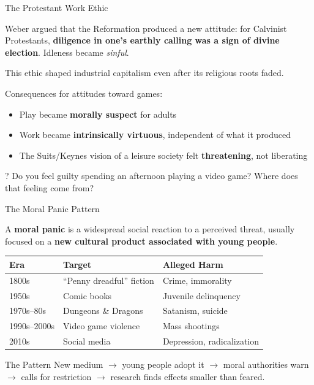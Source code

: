 \documentclass[aspectratio=169,11pt]{beamer}
\begin{document}
\begin{frame}[t]{The Protestant Work Ethic}
\begin{conceptbox}
\footnotesize
Weber argued that the Reformation produced a new attitude: for Calvinist Protestants, \textbf{diligence in one's earthly calling was a sign of divine election}. Idleness became \emph{sinful}.

\vspace{0.1cm}
This ethic shaped industrial capitalism even after its religious roots faded.
\end{conceptbox}

\vspace{0.15cm}
\footnotesize
Consequences for attitudes toward games:
\begin{itemize}
    \item Play became \textbf{morally suspect} for adults
    \item Work became \textbf{intrinsically virtuous}, independent of what it produced
    \item The Suits/Keynes vision of a leisure society felt \textbf{threatening}, not liberating
\end{itemize}

\begin{alertblock}{?}
\scriptsize
Do you feel guilty spending an afternoon playing a video game? Where does that feeling come from?
\end{alertblock}
\end{frame}

\begin{frame}[t]{The Moral Panic Pattern}
\begin{conceptbox}
\footnotesize
A \textbf{moral panic} is a widespread social reaction to a perceived threat, usually focused on a \textbf{new cultural product associated with young people}.
\end{conceptbox}

\vspace{0.05cm}
\begin{center}
\scriptsize
\begin{tabular}{lll}
\toprule
\textbf{Era} & \textbf{Target} & \textbf{Alleged Harm} \\
\midrule
1800s & ``Penny dreadful'' fiction & Crime, immorality \\
1950s & Comic books & Juvenile delinquency \\
1970s--80s & Dungeons \& Dragons & Satanism, suicide \\
1990s--2000s & Video game violence & Mass shootings \\
2010s & Social media & Depression, radicalization \\
\bottomrule
\end{tabular}
\end{center}

\begin{alertblock}{The Pattern}
\scriptsize
New medium $\to$ young people adopt it $\to$ moral authorities warn $\to$ calls for restriction $\to$ research finds effects smaller than feared.
\end{alertblock}
\end{frame}
\end{document}
